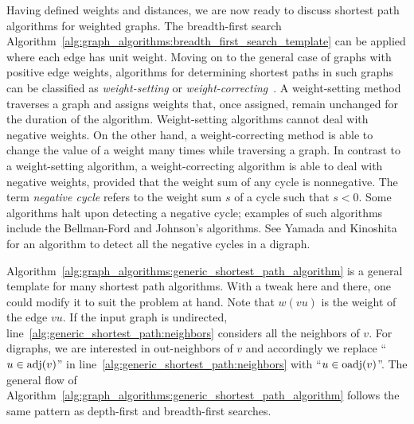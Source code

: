 Having defined weights and distances, we
are now ready to discuss shortest path algorithms
for weighted graphs. The breadth-first
search
Algorithm~\ref{alg:graph_algorithms:breadth_first_search_template} can
be applied where each edge has unit weight. Moving
on to the general case of graphs with positive edge
weights, algorithms for determining shortest
paths in such graphs can be classified as
\emph{weight-setting} or
\emph{weight-correcting}~\cite{GalloPallottino1986}.
A weight-setting method traverses a graph and
assigns weights that, once assigned, remain unchanged for the duration
of the algorithm. Weight-setting algorithms
cannot deal with negative weights. On the other
hand, a weight-correcting method is able to
change the value of a weight many times while traversing a graph. In
contrast to a weight-setting algorithm, a
weight-correcting algorithm is able to deal
with negative weights, provided that the weight
sum of any cycle is
nonnegative. The term
\emph{negative cycle} refers to the weight sum
$s$ of a cycle such that $s < 0$. Some algorithms halt
upon detecting a negative cycle; examples of such algorithms include
the Bellman-Ford and
Johnson's algorithms. See
Yamada and
Kinoshita~\cite{YamadaKinoshita2002} for an
algorithm to detect all the negative cycles in a digraph.

Algorithm~\ref{alg:graph_algorithms:generic_shortest_path_algorithm}
is a general template for many shortest path
algorithms. With a tweak here and there, one could modify it to suit
the problem at hand. Note that $w(vu)$ is the weight of the edge
$vu$. If the input graph is undirected,
line~\ref{alg:generic_shortest_path:neighbors} considers all the
neighbors of $v$. For digraphs, we are interested in
out-neighbors of $v$ and accordingly we replace
``$u \in \operatorname*{adj}(v)$'' in line~\ref{alg:generic_shortest_path:neighbors}
with ``$u \in \operatorname*{oadj}(v)$''. The general flow of
Algorithm~\ref{alg:graph_algorithms:generic_shortest_path_algorithm}
follows the same pattern as depth-first and
breadth-first searches.


